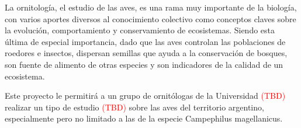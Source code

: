 La ornitología, el estudio de las aves, es una rama muy importante de la biología, con varios aportes diversos al conocimiento colectivo como conceptos claves sobre la evolución, comportamiento y conservamiento de ecosistemas. Siendo esta última de especial importancia, dado que las aves controlan las poblaciones de roedores e insectos, dispersan semillas que ayuda a la conservación de bosques, son fuente de alimento de otras especies y son indicadores de la calidad de un ecosistema.

Este proyecto le permitirá a un grupo de ornitólogas de la Universidad \textcolor{red}{(TBD)} realizar un tipo de estudio \textcolor{red}{(TBD)} sobre las aves del territorio argentino, especialmente pero no limitado a las de la especie Campephilus magellanicus.